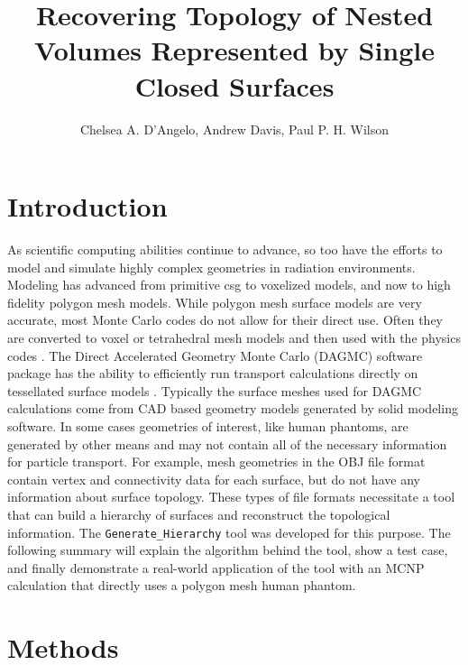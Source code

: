 \documentclass{anstrans}
\title{Recovering Topology of Nested Volumes Represented by Single Closed Surfaces}
\author{Chelsea A. D'Angelo, Andrew Davis, Paul P. H. Wilson}
\institute{
Computational Nuclear Engineering Research Group, University of Wisconsin-Madison, Madison WI}
\begin{document}
\section{Introduction}
As scientific computing abilities continue to advance, so too have the efforts to model
and simulate highly complex geometries in radiation environments.  Modeling has
advanced from primitive csg to voxelized models, and now to high fidelity polygon mesh 
models.  While polygon mesh surface models are very accurate, most Monte Carlo codes
do not allow for their direct use. Often they are converted to voxel or tetrahedral 
mesh models and then used with the physics codes \cite{tetmesh}.
The Direct Accelerated Geometry Monte Carlo (DAGMC) software package
has the ability to efficiently run transport calculations directly on tessellated
surface models \cite{dagmc}.  Typically the surface meshes used for DAGMC 
calculations come from CAD based geometry models generated by solid modeling software.
In some cases geometries of interest, like human phantoms, are generated by other 
means and may not contain all of the necessary information for particle transport. 
For example, mesh geometries in the OBJ file format contain vertex and connectivity
data for each surface, but do not have any information about surface topology.  
These types of file formats necessitate a tool that can build a hierarchy of 
surfaces and reconstruct the topological information.  The \texttt{Generate\_Hierarchy} 
tool was developed for this purpose.  The following summary will explain the algorithm
behind the tool, show a test case, and finally demonstrate a real-world application
of the tool with an MCNP calculation that directly uses a polygon mesh human phantom.
\section{Methods}
\end{document}
